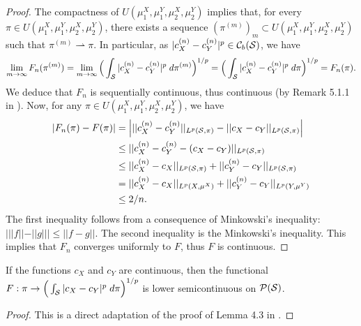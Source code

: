 \begin{proof}
    The compactness of $U(\mu_1^X, \mu_1^Y, \mu_2^X, \mu_2^Y)$ implies that, for every
    $\pi \in U(\mu_1^X, \mu_1^Y, \mu_2^X, \mu_2^Y)$,
    there exists a sequence $(\pi^{(m)})_m \subset U(\mu_1^X, \mu_1^Y, \mu_2^X, \mu_2^Y)$ such that
    $\pi^{(m)} \rightharpoonup \pi$. In particular, as
    $\vert c_X^{(n)} - c_Y^{(n)} \vert^p \in \mathcal C_b(\mathcal S)$, we have
    \begin{equation}
      \begin{split}
        \lim_{m \to \infty} F_n(\pi^{(m)}) =
        \lim_{m \to \infty} \Big( \int_{\mathcal S} \vert c_X^{(n)} - c_Y^{(n)} \vert^p \;
        d\pi^{(m)} \Big)^{1/p}
        = \Big( \int_{\mathcal S} \vert c_X^{(n)} - c_Y^{(n)} \vert^p \; d\pi \Big)^{1/p} = F_n(\pi).
      \end{split}
    \end{equation}
    We deduce that $F_n$ is sequentially continuous, thus continuous
    (by Remark 5.1.1 in \citep{Ambrosio05}).
    Now, for any $\pi \in U(\mu_1^X, \mu_1^Y, \mu_2^X, \mu_2^Y)$, we have
    \begin{equation}
      \begin{split}
        \vert F_n(\pi) - F(\pi) \vert &=
        \Big\vert \vert\vert c_X^{(n)} - c_Y^{(n)} \vert\vert_{L^p(\mathcal S, \pi)}
        - \vert\vert c_X - c_Y \vert\vert_{L^p(\mathcal S, \pi)} \Big\vert \\
        &\leq \vert\vert c_X^{(n)} - c_Y^{(n)} - (c_X - c_Y) \vert\vert_{L^p(\mathcal S, \pi)} \\
        &\leq \vert\vert c_X^{(n)} - c_X \vert\vert_{L^p(\mathcal S, \pi)} +
        \vert\vert c_Y^{(n)} - c_Y \vert\vert_{L^p(\mathcal S, \pi)} \\
        &= \vert\vert c_X^{(n)} - c_X \vert\vert_{L^p(X, \mu^X)} +
        \vert\vert c_Y^{(n)} - c_Y \vert\vert_{L^p(Y, \mu^Y)} \\
        &\leq 2/n.
      \end{split}
    \end{equation}
    The first inequality follows from a consequence of Minkowski's inequality:
    $ \Big\vert \vert\vert f \vert\vert - \vert\vert g \vert\vert \Big\vert
    \leq \vert\vert f-g \vert\vert$. The second inequality is the Minkowski's inequality.
    This implies that $F_n$ converges uniformly to $F$, thus $F$ is continuous.
  \end{proof}
  \begin{lemma} \label{continuous_cont}
    If the functions $c_X$ and $c_Y$ are continuous, then the functional
    $F: \pi \to \Big( \int_{\mathcal S} \vert c_X - c_Y \vert^p \; d\pi \Big)^{1/p}$
    is lower semicontinuous on $\mathcal P(\mathcal S)$.
  \end{lemma}
  \begin{proof}
    This is a direct adaptation of the proof of Lemma 4.3 in \citep{Villani08}.
  \end{proof}

